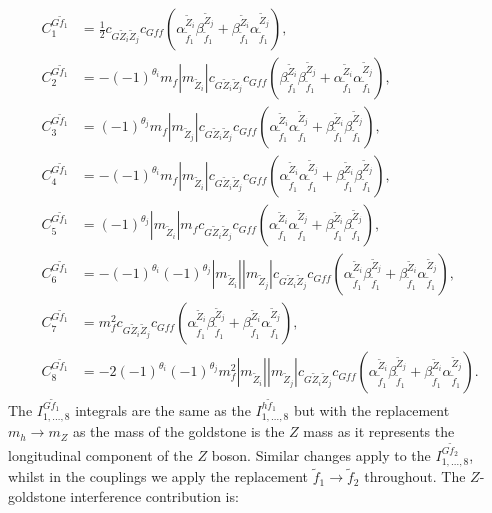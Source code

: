 \documentclass[final,3p,times,pdflatex]{elsarticle}
\begin{document}
\begin{align}
C_{1}^{G \tilde{f}_1} &= \frac{1}{2} c_{G \tilde{Z}_i \tilde{Z}_j} c_{G f f}({\alpha_{\tilde{f}_1}^{\tilde{Z}_i}}{\beta_{\tilde{f}_1}^{\tilde{Z}_j}} + {\beta_{\tilde{f}_1}^{\tilde{Z}_i}}{\alpha_{\tilde{f}_1}^{\tilde{Z}_j}}), \\
C_{2}^{G \tilde{f}_1} &= -(-1)^{\theta_i}m_{f}|m_{\tilde{Z}_i}| c_{G \tilde{Z}_i \tilde{Z}_j} c_{G f f}({\beta_{\tilde{f}_1}^{\tilde{Z}_i}}{\beta_{\tilde{f}_1}^{\tilde{Z}_j}} + {\alpha_{\tilde{f}_1}^{\tilde{Z}_i}}{\alpha_{\tilde{f}_1}^{\tilde{Z}_j}}), \\
C_{3}^{G \tilde{f}_1} &= (-1)^{\theta_j}m_{f}|m_{\tilde{Z}_j}| c_{G \tilde{Z}_i \tilde{Z}_j} c_{G f f}({\alpha_{\tilde{f}_1}^{\tilde{Z}_i}}{\alpha_{\tilde{f}_1}^{\tilde{Z}_j}} + {\beta_{\tilde{f}_1}^{\tilde{Z}_i}}{\beta_{\tilde{f}_1}^{\tilde{Z}_j}}), \\
C_{4}^{G \tilde{f}_1} &= -(-1)^{\theta_i}m_{f}|m_{\tilde{Z}_i}| c_{G \tilde{Z}_i \tilde{Z}_j} c_{G f f}({\alpha_{\tilde{f}_1}^{\tilde{Z}_i}}{\alpha_{\tilde{f}_1}^{\tilde{Z}_j}} + {\beta_{\tilde{f}_1}^{\tilde{Z}_i}}{\beta_{\tilde{f}_1}^{\tilde{Z}_j}}), \\
C_{5}^{G \tilde{f}_1} &= (-1)^{\theta_j}|m_{\tilde{Z}_i}|m_{f} c_{G \tilde{Z}_i \tilde{Z}_j} c_{G f f}({\alpha_{\tilde{f}_1}^{\tilde{Z}_i}}{\alpha_{\tilde{f}_1}^{\tilde{Z}_j}} + {\beta_{\tilde{f}_1}^{\tilde{Z}_i}}{\beta_{\tilde{f}_1}^{\tilde{Z}_j}}),  \\
C_{6}^{G \tilde{f}_1} &= -(-1)^{\theta_i}(-1)^{\theta_j}|m_{\tilde{Z}_i}||m_{\tilde{Z}_j}| c_{G \tilde{Z}_i \tilde{Z}_j} c_{G f f}({\alpha_{\tilde{f}_1}^{\tilde{Z}_i}}{\beta_{\tilde{f}_1}^{\tilde{Z}_j}} + {\beta_{\tilde{f}_1}^{\tilde{Z}_i}}{\alpha_{\tilde{f}_1}^{\tilde{Z}_j}}),  \\
C_{7}^{G \tilde{f}_1} &= m_{f}^2 c_{G \tilde{Z}_i \tilde{Z}_j} c_{G f f}({\alpha_{\tilde{f}_1}^{\tilde{Z}_i}}{\beta_{\tilde{f}_1}^{\tilde{Z}_j}} + {\beta_{\tilde{f}_1}^{\tilde{Z}_i}}{\alpha_{\tilde{f}_1}^{\tilde{Z}_j}}),  \\
C_{8}^{G \tilde{f}_1} &= -2(-1)^{\theta_i}(-1)^{\theta_j}m_{f}^2|m_{\tilde{Z}_i}||m_{\tilde{Z}_j}| c_{G \tilde{Z}_i \tilde{Z}_j} c_{G f f}({\alpha_{\tilde{f}_1}^{\tilde{Z}_i}}{\beta_{\tilde{f}_1}^{\tilde{Z}_j}} + {\beta_{\tilde{f}_1}^{\tilde{Z}_i}}{\alpha_{\tilde{f}_1}^{\tilde{Z}_j}}).  
\end{align}
The $I_{1,\ldots, 8}^{G \tilde{f}_1}$ integrals are the same as the $I_{1,\ldots,8}^{h \tilde{f}_1}$ but with the replacement $m_{h} \rightarrow m_{Z}$ as the mass of the goldstone is the $Z$ mass as it represents the longitudinal component of the $Z$ boson. Similar changes apply to the $I_{1,\ldots,8}^{G \tilde{f}_2}$, whilst in the couplings we apply the replacement $\tilde{f}_1 \rightarrow \tilde{f}_2$ throughout. The $Z$-goldstone interference contribution is:
\end{document}
